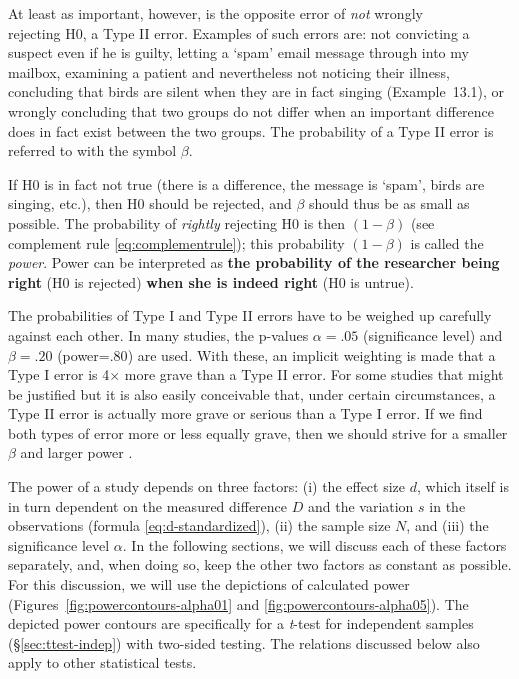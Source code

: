 \documentclass[
]{book}
\begin{document}
At least as important, however, is the opposite error of \emph{not} wrongly\\
rejecting H0, a Type II error. Examples of such errors are:
not convicting a suspect even if he is guilty, letting a `spam'
email message through into my mailbox, examining a patient and nevertheless
not noticing their illness, concluding that birds are silent when
they are in fact singing
(Example~13.1), or wrongly concluding that two
groups do not differ when an important difference does in fact exist
between the two groups. The probability of a Type II error is referred to
with the symbol \(\beta\).

If H0 is in fact not true (there is a difference, the message is `spam',
birds are singing, etc.), then H0 should be rejected, and
\(\beta\) should thus be as small as possible. The probability of \emph{rightly}
rejecting H0 is then \((1-\beta)\) (see complement rule \eqref{eq:complementrule});
this probability \((1-\beta)\) is called the \emph{power}.
Power can be interpreted as \textbf{the probability of the researcher
being right} (H0 is rejected) \textbf{when she is indeed right} (H0 is untrue).

The probabilities of Type I and Type II errors have to be weighed up
carefully against each other. In many studies, the p-values
\(\alpha=.05\) (significance level) and \(\beta=.20\)
(power=\(.80\)) are used. With these, an implicit weighting is made
that a Type I error is 4× more grave than a Type II error.
For some studies that might be justified but it is also easily
conceivable that, under certain circumstances, a Type II error is
actually more grave or serious than a Type I error. If we find both types of
error more or less equally grave, then we should strive for
a smaller \(\beta\) and larger power \citep{Rose08}.

The power of a study depends on three factors: (i) the effect
size \(d\), which itself is in turn dependent on the measured difference
\(D\) and the variation \(s\) in the observations
(formula \eqref{eq:d-standardized}), (ii) the sample size \(N\), and (iii)
the significance level \(\alpha\). In the following sections, we will
discuss each of these factors separately, and, when doing so, keep the other
two factors as constant as possible. For this discussion, we will use the
depictions of calculated power
(Figures~\ref{fig:powercontours-alpha01} and
\ref{fig:powercontours-alpha05}). The depicted power contours are specifically
for a \emph{t}-test for independent samples
(§\ref{sec:ttest-indep}) with two-sided testing.
The relations discussed below also apply to other statistical
tests.
\end{document}
